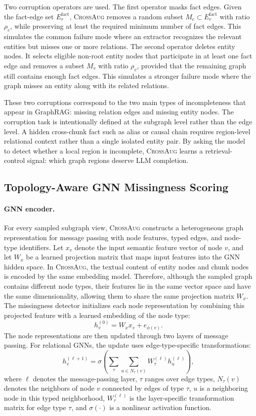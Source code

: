 \documentclass[11pt]{article}
\newcommand{\ours}{\textsc{CrossAug}\xspace}
\begin{document}
Two corruption operators are used. The first operator masks fact edges. Given the fact-edge set $E_r^{\mathrm{fact}}$, \ours removes a random subset $M_e \subset E_r^{\mathrm{fact}}$ with ratio $\rho_e$, while preserving at least the required minimum number of fact edges. This simulates the common failure mode where an extractor recognizes the relevant entities but misses one or more relations. The second operator deletes entity nodes. It selects eligible non-root entity nodes that participate in at least one fact edge and removes a subset $M_v$ with ratio $\rho_v$, provided that the remaining graph still contains enough fact edges. This simulates a stronger failure mode where the graph misses an entity along with its related relations.

These two corruptions correspond to the two main types of incompleteness that appear in GraphRAG: missing relation edges and missing entity nodes. The corruption task is intentionally defined at the subgraph level rather than the edge level. A hidden cross-chunk fact such as alias or causal chain requires region-level relational context rather than a single isolated entity pair. By asking the model to detect whether a local region is incomplete, \ours learns a retrieval-control signal: which graph regions deserve LLM completion.

\subsection{Topology-Aware GNN Missingness Scoring}

\paragraph{GNN encoder.}
For every sampled subgraph view, \ours constructs a heterogeneous graph representation for message passing with node features, typed edges, and node-type identifiers. Let $x_v$ denote the input semantic feature vector of node $v$, and let $W_x$ be a learned projection matrix that maps input features into the GNN hidden space. In \ours, the textual content of entity nodes and chunk nodes is encoded by the same embedding model. Therefore, although the sampled graph contains different node types, their features lie in the same vector space and have the same dimensionality, allowing them to share the same projection matrix $W_x$. The missingness detector initializes each node representation by combining this projected feature with a learned embedding of the node type:
\[
h_v^{(0)} = W_x x_v + e_{\phi(v)}.
\]
The node representations are then updated through two layers of message passing. For relational GNNs, the update uses edge-type-specific transformations:
\[
h_v^{(\ell+1)} =
\sigma\!\left(
\sum_{\tau}\sum_{u\in N_{\tau}(v)}
W_{\tau}^{(\ell)} h_u^{(\ell)}
\right),
\]
where $\ell$ denotes the message-passing layer, $\tau$ ranges over edge types, $N_{\tau}(v)$ denotes the neighbors of node $v$ connected by edges of type $\tau$, $u$ is a neighboring node in this typed neighborhood, $W_{\tau}^{(\ell)}$ is the layer-specific transformation matrix for edge type $\tau$, and $\sigma(\cdot)$ is a nonlinear activation function.
\end{document}
